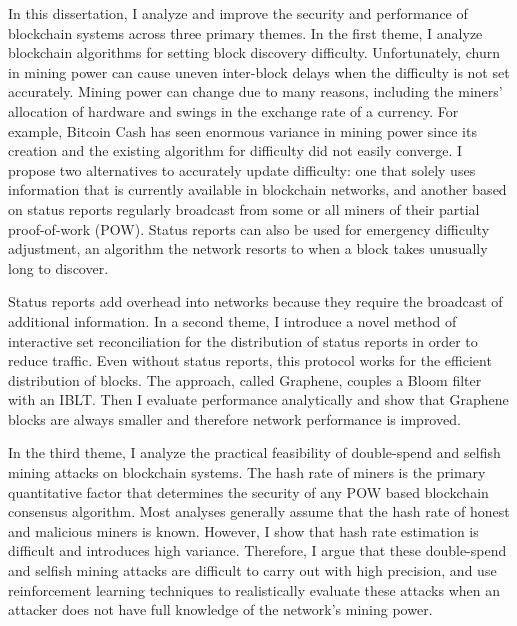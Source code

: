 
In this dissertation, I analyze and improve the security and performance of blockchain systems across three primary themes. In the first theme, I analyze blockchain algorithms for setting block discovery difficulty. Unfortunately, churn in mining power can cause uneven inter-block delays when the difficulty is not set accurately.  Mining power can change due to many reasons, including the miners' allocation of hardware and swings in the exchange rate of a currency.  For example, Bitcoin Cash has seen enormous variance in mining power since its creation and the existing algorithm for difficulty did not easily converge. I propose two alternatives to accurately update difficulty: one that solely uses information that is currently available in blockchain networks, and another based on status reports regularly broadcast from some or all miners of their partial proof-of-work (POW). Status reports can also be used for emergency difficulty adjustment, an algorithm the network resorts to when a block takes unusually long to discover.

Status reports add overhead into networks because they require the broadcast of additional information. In a second theme, I introduce a novel method of interactive set reconciliation for the distribution of status reports in order to reduce traffic.   Even without status reports, this protocol works for the efficient distribution of blocks. The approach, called Graphene, couples a Bloom filter with an IBLT. Then I evaluate performance analytically and show that Graphene blocks are always smaller and therefore network performance is improved.

In the third theme, I analyze the practical feasibility of double-spend and selfish mining attacks on blockchain systems. The hash rate of miners is the primary quantitative factor that determines the security of any POW based blockchain consensus algorithm. Most analyses generally assume that the hash rate of honest and malicious miners is known. However, I show that hash rate estimation is difficult and introduces high variance. Therefore, I argue that these double-spend and selfish mining attacks are difficult to carry out with high precision, and use reinforcement learning techniques to realistically evaluate these attacks when an attacker does not have full knowledge of the network's mining power.
